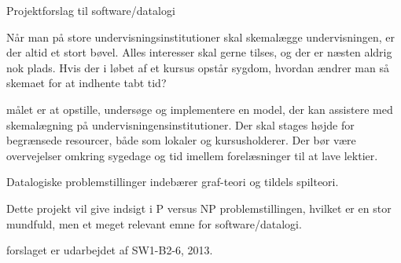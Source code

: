 
Projektforslag til software/datalogi

Når man på store undervisningsinstitutioner skal skemalægge undervisningen, er der altid et stort bøvel. Alles interesser skal gerne tilses, og der er næsten aldrig nok plads. Hvis der i løbet af et kursus opstår sygdom, hvordan ændrer man så skemaet for at indhente tabt tid?

målet er at opstille, undersøge og implementere en model, der kan assistere med skemalægning på undervisningensinstitutioner. Der skal stages højde for begrænsede resourcer, både som lokaler og kursusholderer. Der bør være overvejelser omkring sygedage og tid imellem forelæsninger til at lave lektier.

Datalogiske problemstillinger indebærer graf-teori og tildels spilteori.

Dette projekt vil give indsigt i P versus NP problemstillingen, hvilket er en stor mundfuld, men et meget relevant emne for software/datalogi. 

forslaget er udarbejdet af SW1-B2-6, 2013.